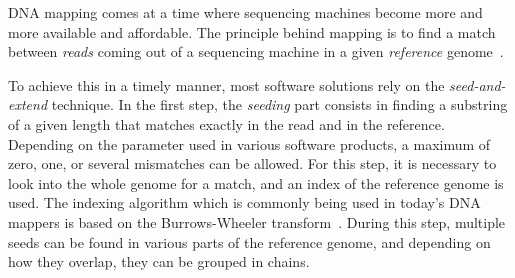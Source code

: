 DNA mapping comes at a time where sequencing machines become more and more available and affordable. The principle behind mapping is to find a match between \emph{reads} coming out of a sequencing machine in a given \emph{reference} genome~\cite{misc:mapping}. 

To achieve this in a timely manner, most software solutions rely on the \emph{seed-and-extend} technique. In the first step, the \emph{seeding} part consists in finding a substring of a given length that matches exactly in the read and in the reference. Depending on the parameter used in various software products, a maximum of zero, one, or several mismatches can be allowed. For this step, it is necessary to look into the whole genome for a match, and an index of the reference genome is used. The indexing algorithm which is commonly being used in today's DNA mappers is based on the Burrows-Wheeler transform~\cite{BurrowsWheeler:align}. During this step, multiple seeds can be found in various parts of the reference genome, and depending on how they overlap, they can be grouped in chains.


